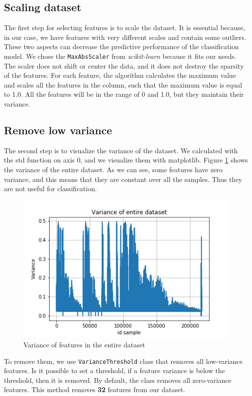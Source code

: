 \subsection{Scaling dataset}
The first step for selecting features is to scale the dataset. It is essential because, in our case, we have features with very different scales and contain some outliers. These two aspects can decrease the predictive performance of the classification model. We chose the \texttt{MaxAbsScaler} from \textit{scikit-learn} because it fits our needs. The scaler does not shift or center the data, and it does not destroy the sparsity of the features. For each feature, the algorithm calculates the maximum value and scales all the features in the column, such that the maximum value is equal to 1.0. All the features will be in the range of 0 and 1.0, but they maintain their variance.

\subsection{Remove low variance}
The second step is to visualize the variance of the dataset. We calculated with the std function on axis 0, and we visualize them with matplotlib. Figure \ref{fig:var_all} shows the variance of the entire dataset. As we can see, some features have zero variance, and this means that they are constant over all the samples. Thus they are not useful for classification.

\begin{figure}[!h]
	\centering
	\includegraphics[width=0.6\columnwidth]{variance-all.png}
	\caption{Variance of features in the entire dataset}
	\label{fig:var_all}
\end{figure}

To remove them, we use \texttt{VarianceThreshold} class that removes all low-variance features. Is it possible to set a threshold, if a feature variance is below the threshold, then it is removed. By default, the class removes all zero-variance features. This method removes \textbf{32} features from our dataset.

